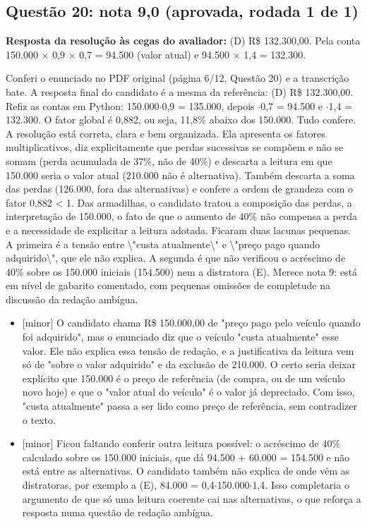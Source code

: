 \documentclass{article}%
\begin{document}
\subsection*{Questão 20: nota 9,0 (aprovada, rodada 1 de 1)}%
\textbf{Resposta da resolução às cegas do avaliador:} (D) R\$ 132.300,00. Pela conta 150.000 $\times$ 0,9 $\times$ 0,7 = 94.500 (valor atual) e 94.500 $\times$ 1,4 = 132.300.\par %
Conferi o enunciado no PDF original (página 6/12, Questão 20) e a transcrição bate. A resposta final do candidato é a mesma da referência: (D) R\$ 132.300,00. Refiz as contas em Python: 150.000$\cdot$0,9 = 135.000, depois $\cdot$0,7 = 94.500 e $\cdot$1,4 = 132.300. O fator global é 0,882, ou seja, 11,8\% abaixo dos 150.000. Tudo confere. A resolução está correta, clara e bem organizada. Ela apresenta os fatores multiplicativos, diz explicitamente que perdas sucessivas se compõem e não se somam (perda acumulada de 37\%, não de 40\%) e descarta a leitura em que 150.000 seria o valor atual (210.000 não é alternativa). Também descarta a soma das perdas (126.000, fora das alternativas) e confere a ordem de grandeza com o fator 0,882 < 1. Das armadilhas, o candidato tratou a composição das perdas, a interpretação de 150.000, o fato de que o aumento de 40\% não compensa a perda e a necessidade de explicitar a leitura adotada. Ficaram duas lacunas pequenas. A primeira é a tensão entre \textbackslash{}"custa atualmente\textbackslash{}" e \textbackslash{}"preço pago quando adquirido\textbackslash{}", que ele não explica. A segunda é que não verificou o acréscimo de 40\% sobre os 150.000 iniciais (154.500) nem a distratora (E). Merece nota 9: está em nível de gabarito comentado, com pequenas omissões de completude na discussão da redação ambígua.%
\begin{itemize}%
\item%
{[}minor{]} O candidato chama R\$ 150.000,00 de "preço pago pelo veículo quando foi adquirido", mas o enunciado diz que o veículo "custa atualmente" esse valor. Ele não explica essa tensão de redação, e a justificativa da leitura vem só de "sobre o valor adquirido" e da exclusão de 210.000. O certo seria deixar explícito que 150.000 é o preço de referência (de compra, ou de um veículo novo hoje) e que o "valor atual do veículo" é o valor já depreciado. Com isso, "custa atualmente" passa a ser lido como preço de referência, sem contradizer o texto.%
\item%
{[}minor{]} Ficou faltando conferir outra leitura possível: o acréscimo de 40\% calculado sobre os 150.000 iniciais, que dá 94.500 + 60.000 = 154.500 e não está entre as alternativas. O candidato também não explica de onde vêm as distratoras, por exemplo a (E), 84.000 = 0,4$\cdot$150.000$\cdot$1,4. Isso completaria o argumento de que só uma leitura coerente cai nas alternativas, o que reforça a resposta numa questão de redação ambígua.%
\end{itemize}%
\end{document}
